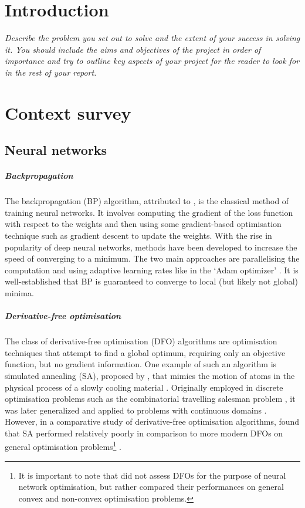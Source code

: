 \chapter{Introduction}
\textit{Describe the problem you set out to solve and the
extent of your success in solving it. You should include
the aims and objectives of the project in order of
importance and try to outline key aspects of your
project for the reader to look for in the rest of your
report.}
\todo

\chapter{Context survey}
\section{Neural networks}

\paragraph{Backpropagation}
The backpropagation (BP) algorithm, attributed to \textcite{rumelhart1986}, is the classical method of training neural networks.
It involves computing the gradient of the loss function with respect to the weights and then using some gradient-based optimisation technique such as gradient descent to update the weights.
With the rise in popularity of deep neural networks, methods have been developed to increase the speed of converging to a minimum. 
The two main approaches are parallelising the computation and using adaptive learning rates like in the `Adam optimizer' \cite{kingma2014}.
It is well-established that BP is guaranteed to converge to local (but likely not global) minima.

\paragraph{Derivative-free optimisation}
The class of derivative-free optimisation (DFO) algorithms are optimisation techniques that attempt to find a global optimum, requiring only an objective function, but no gradient information.
One example of such an algorithm is simulated annealing (SA), proposed by \citeauthor{kirkpatrick1983}, that mimics the motion of atoms in the physical process of a slowly cooling material \cite*{kirkpatrick1983}.
Originally employed in discrete optimisation problems such as the combinatorial travelling salesman problem \cite{cerny1985}, it was later generalized and applied to problems with continuous domains \cite{belisle1993}.
However, in a comparative study of derivative-free optimisation algorithms, \citeauthor{rios2009} found that SA performed relatively poorly in comparison to more modern DFOs on general optimisation problems\footnote{It is important to note that \citeauthor{rios2009} did not assess DFOs for the purpose of neural network optimisation, but rather compared their performances on general convex and non-convex optimisation problems.} \cite*{rios2009}.

